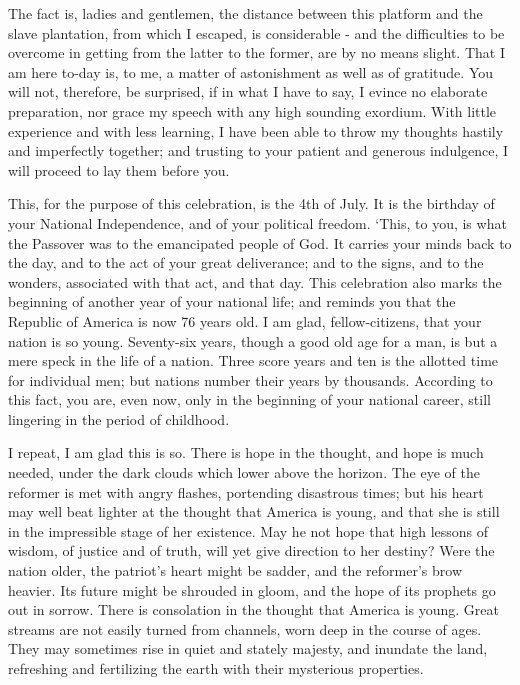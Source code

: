 The fact is, ladies and gentlemen, the distance between this platform and the slave plantation, from which I escaped, is considerable - and the difficulties to be overcome in getting from the latter to the former, are by no means slight. That I am here to-day is, to me, a matter of astonishment as well as of gratitude. You will not, therefore, be surprised, if in what I have to say, I evince no elaborate preparation, nor grace my speech with any high sounding exordium. With little experience and with less learning, I have been able to throw my thoughts hastily and imperfectly together; and trusting to your patient and generous indulgence, I will proceed to lay them before you.\par

This, for the purpose of this celebration, is the 4th of July. It is the birthday of your National Independence, and of your political freedom. ‘This, to you, is what the Passover was to the emancipated people of God. It carries your minds back to the day, and to the act of your great deliverance; and to the signs, and to the wonders, associated with that act, and that day. This celebration also marks the beginning of another year of your national life; and reminds you that the Republic of America is now 76 years old. I am glad, fellow-citizens, that your nation is so young. Seventy-six years, though a good old age for a man, is but a mere speck in the life of a nation. Three score years and ten is the allotted time for individual men; but nations number their years by thousands. According to this fact, you are, even now, only in the beginning of your national career, still lingering in the period of childhood.\par

I repeat, I am glad this is so. There is hope in the thought, and hope is much needed, under the dark clouds which lower above the horizon. The eye of the reformer is met with angry flashes, portending disastrous times; but his heart may well beat lighter at the thought that America is young, and that she is still in the impressible stage of her existence. May he not hope that high lessons of wisdom, of justice and of truth, will yet give direction to her destiny? Were the nation older, the patriot’s heart might be sadder, and the reformer’s brow heavier. Its future might be shrouded in gloom, and the hope of its prophets go out in sorrow. There is consolation in the thought that America is young. Great streams are not easily turned from channels, worn deep in the course of ages. They may sometimes rise in quiet and stately majesty, and inundate the land, refreshing and fertilizing the earth with their mysterious properties.\par

